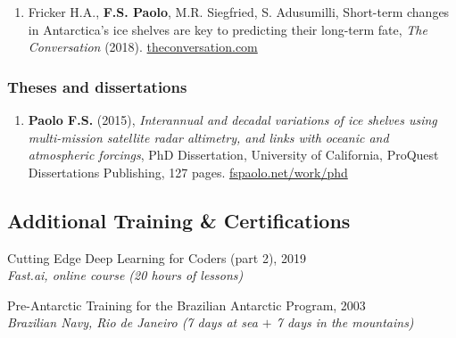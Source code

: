 \documentclass[12pt,]{scrartcl}
\begin{document}
\begin{enumerate}
\leftskip-0.13in

\item Fricker H.A., \textbf{F.S. Paolo}, M.R. Siegfried, S. Adusumilli, Short-term changes in Antarctica’s ice shelves are key to predicting their long-term fate, \textit{The Conversation} (2018). \href{https://theconversation.com/short-term-changes-in-antarcticas-ice-shelves-are-key-to-predicting-their-long-term-fate-95207}{theconversation.com}



\end{enumerate}


\subsubsection{Theses and dissertations}

\begin{enumerate}
\leftskip-0.13in %

\item \textbf{Paolo F.S.} (2015), \textit{Interannual and decadal variations of ice shelves using multi-mission satellite radar altimetry, and links with oceanic and atmospheric forcings}, PhD Dissertation, University of California, ProQuest Dissertations Publishing, 127 pages. \href{http://fspaolo.net/work/phd/}{fspaolo.net/work/phd}


\end{enumerate}


\subsection{Additional Training \& Certifications}

Cutting Edge Deep Learning for Coders (part 2), 2019 \\
\textit{Fast.ai, online course (20 hours of lessons)}

Pre-Antarctic Training for the Brazilian Antarctic Program, 2003 \\
\textit{Brazilian Navy, Rio de Janeiro (7 days at sea $+$ 7 days in the mountains)} \\




\end{document}
